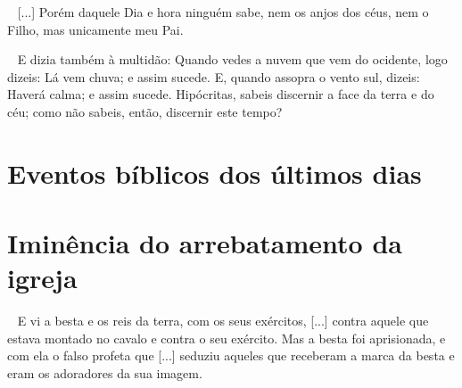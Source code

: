 \documentclass[12pt,aspectratio=169]{beamer}
\newcommand{\ver}[1]{%
    \raisebox{0.50ex}{%
        \scalebox{1.1}{%
            \pmb{\textbf{\textcolor{BSpbg}{#1}}}%
        }%
    }%
}
\newcommand{\QUOTE}[1]{%
    \par\noindent\hspace*{0.1\linewidth}%
    \begin{minipage}{0.8\linewidth}%
        \linespread{1.35}\large{#1}%
    \end{minipage}%
}
\newcommand{\RED}[1]{{\textcolor{TXred}{#1}}}
\newcommand{\ORA}[1]{{\textcolor{TXora}{#1}}}
\newcommand{\YEL}[1]{{\textcolor{TXyel}{#1}}}
\newcommand{\GRE}[1]{{\textcolor{TXgre}{#1}}}
\newcommand{\CYA}[1]{{\textcolor{TXcya}{#1}}}
\newcommand{\MAG}[1]{{\textcolor{TXmag}{#1}}}
\newcommand{\BRI}[1]{{\textcolor{BSpbg}{#1}}}   %
\begin{document}
    \begin{frame}
        \QUOTE{%
            \ver{(ARC) Mt~24.32--36}~%
            [...] Porém daquele \MAG{Dia e hora} ninguém sabe, nem os anjos dos céus, nem o
            Filho, mas unicamente meu Pai.
        }
    \end{frame}

    \begin{frame}
        \QUOTE{%
            \ver{(ARC) Lc~12.54--56}~%
            E \CYA{dizia} também à multidão: \YEL{Quando vedes}  a  \GRE{nuvem  que  vem  do
            ocidente}, logo \YEL{dizeis}: \GRE{Lá  vem  chuva};  \MAG{e  assim  sucede}.  E,
            \YEL{quando} \GRE{assopra o vento sul}, \YEL{dizeis}: \GRE{Haverá calma}; \MAG{e
            assim sucede}. \RED{Hipócritas, sabeis discernir a face da terra e do céu;  como
            não sabeis, então, discernir este tempo?}
        }
    \end{frame}

\section{Eventos bíblicos dos últimos dias}

\section{Iminência do arrebatamento da igreja}

    \begin{frame}
        \QUOTE{%
            \ver{(ARA) Ap~19.19,20}~%
            E vi a \YEL{besta} e os reis da terra,  com  os  seus  exércitos,  [...]  contra
            \BRI{aquele que estava montado no  cavalo}  e  contra  o  seu  exército.  Mas  a
            \YEL{besta} foi aprisionada, e com ela o \ORA{falso profeta} que  [...]  seduziu
            aqueles que receberam a \MAG{marca da besta} e eram os  adoradores  da  \GRE{sua
            imagem}. \\[\bigskipamount]
        }
    \end{frame}
\end{document}

